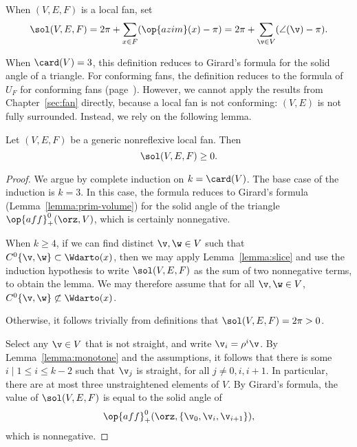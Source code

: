 \begin{definition}  When $(V,E,F)$ is a local fan, set
\[
\sol(V,E,F) =  2\pi + \sum_{x\in F}(\op{azim}(x)-\pi) = 2\pi + \sum_{\v\in V} (\angle(\v) -\pi).
\]
\end{definition}
%

When $\card(V)=3$, this definition reduces to Girard's formula for the
solid angle of a triangle.  For conforming fans, the definition
reduces to the  formula of $U_F$ for conforming fans
(page~\pageref{def:conforming}).  However, we cannot apply the results
from Chapter~\ref{sec:fan} directly, because a local fan is not
conforming: $(V,E)$ is not fully surrounded. Instead, we rely on the
following lemma.


\begin{lemma}\label{lemma:sol-local}
Let $(V,E,F)$ be a generic nonreflexive local fan.  Then
\[
\sol(V,E,F) \ge 0.  %
\]
\end{lemma}

\begin{proof} 
  We argue by complete induction on $k=\card(V)$.  The base case of
  the induction is $k=3$.  In this case, the formula reduces to
  Girard's formula (Lemma~\ref{lemma:prim-volume}) for the solid angle
  of the triangle $\op{aff}_+^0(\orz,V)$, which is certainly
  nonnegative.

  When $k\ge4$, if we can find distinct $\v,\w\in V$ such that
  $C^0\{\v,\w\}\subset \Wdarto(x)$, then we may apply
  Lemma~\ref{lemma:slice} and use the induction hypothesis to write
  $\sol(V,E,F)$ as the sum of two nonnegative terms, to obtain the
  lemma.  We may therefore assume that for all $\v,\w\in V$,
  $C^0\{\v,\w\}\not\subset \Wdarto(x)$.

  Otherwise,
it follows trivially from definitions that $\sol(V,E,F)=2\pi>0$.

Select any $\v\in V$ that is not straight, and write $\v_i = \rho^i\v$.  By
Lemma~\ref{lemma:monotone} and the assumptions, it follows that there
is some $i\mid 1 \le i \le k-2$ such that $\v_j$ is straight, for all
$j\ne 0,i,i+1$.  In particular, there are at most three unstraightened 
elements of $V$.  By Girard's formula, the value of $\sol(V,E,F)$ is
equal to the solid angle of
\[
\op{aff}_+^0(\orz,\{\v_0,\v_i,\v_{i+1}\}),
\]
which is nonnegative.
\end{proof}




